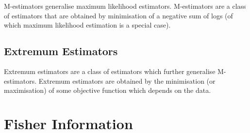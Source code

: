 \documentclass[11pt]{report} %
\begin{document}
M-estimators generalise maximum likelihood estimators. M-estimators are a class of estimators that are obtained by minimisation of a negative sum of logs (of which maximum likelihood estimation is a special case).

\subsection{Extremum Estimators}

Extremum estimators are a class of estimators which further generalise M-estimators. Extremum estimators are obtained by the minimisation (or maximisation) of some objective function which depends on the data.

\section{Fisher Information}
\end{document}
